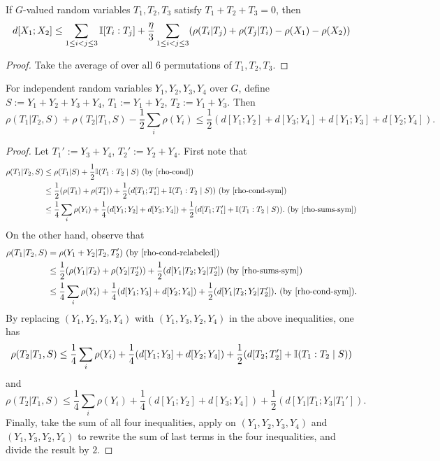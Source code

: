 \begin{lemma}\label{rho-BSG-triplet-symmetrized}
  If $G$-valued random variables $T_1,T_2,T_3$ satisfy $T_1+T_2+T_3=0$, then
  $$d[X_1;X_2] \leq  \sum_{1 \leq i<j \leq 3} \mathbb{I}[T_i:T_j] + \frac{\eta}{3}   \sum_{1 \leq i<j \leq 3} (\rho(T_i|T_j) + \rho(T_j|T_i) -\rho(X_1)-\rho(X_2))$$
\end{lemma}
\begin{proof}
  Take the average of  over all $6$ permutations of $T_1,T_2,T_3$.
\end{proof}


\begin{lemma}\label{rho-increase}
  For independent random variables $Y_1,Y_2,Y_3,Y_4$ over $G$, define $S:=Y_1+Y_2+Y_3+Y_4$, $T_1:=Y_1+Y_2$, $T_2:=Y_1+Y_3$. Then
  $$\rho(T_1|T_2,S)+\rho(T_2|T_1,S) - \frac{1}{2}\sum_{i} \rho(Y_i)\le \frac{1}{2}(d[Y_1;Y_2]+d[Y_3;Y_4]+d[Y_1;Y_3]+d[Y_2;Y_4]).$$
\end{lemma}
\begin{proof}
  Let $T_1':=Y_3+Y_4$, $T_2':=Y_2+Y_4$.
  First note that
  \begin{align*}
    \rho(T_1|T_2,S)
    &\le \rho(T_1|S) + \frac{1}{2}\bbI(T_1:T_2\mid S)  \textrm{ (by \Cref{rho-cond})}\\
    &\le \frac{1}{2}(\rho(T_1)+\rho(T_1'))+\frac{1}{2}(d[T_1;T_1']+\bbI(T_1:T_2\mid S)) \textrm{ (by \Cref{rho-cond-sym})}\\
    &\le \frac{1}{4} \sum_{i} \rho(Y_i) +\frac{1}{4}(d[Y_1;Y_2]+d[Y_3;Y_4]) + \frac{1}{2}(d[T_1;T_1']+\bbI(T_1:T_2\mid S)). \textrm{ (by \Cref{rho-sums-sym})}
  \end{align*}
  On the other hand, observe that
  \begin{align*}
    \rho(T_1|T_2,S)
    &=\rho(Y_1+Y_2|T_2,T_2') \textrm{ (by \Cref{rho-cond-relabeled})}\\
    &\le \frac{1}{2}(\rho(Y_1|T_2)+\rho(Y_2|T_2'))+\frac{1}{2}(d[Y_1|T_2;Y_2|T_2'])  \textrm{ (by \Cref{rho-sums-sym})}\\
    &\le \frac{1}{4} \sum_{i} \rho(Y_i) +\frac{1}{4}(d[Y_1;Y_3]+d[Y_2;Y_4]) + \frac{1}{2}(d[Y_1|T_2;Y_2|T_2']). \textrm{ (by \Cref{rho-cond-sym})}.
  \end{align*}
  By replacing $(Y_1,Y_2,Y_3,Y_4)$ with $(Y_1,Y_3,Y_2,Y_4)$ in the above inequalities, one has
  $$\rho(T_2|T_1,S) \le \frac{1}{4} \sum_{i} \rho(Y_i) +\frac{1}{4}(d[Y_1;Y_3]+d[Y_2;Y_4]) + \frac{1}{2}(d[T_2;T_2']+\mathbb{I}(T_1:T_2\mid S))$$
  and
  $$\rho(T_2|T_1,S) \le \frac{1}{4} \sum_{i} \rho(Y_i) +\frac{1}{4}(d[Y_1;Y_2]+d[Y_3;Y_4]) + \frac{1}{2}(d[Y_1|T_1;Y_3|T_1']).$$
  Finally, take the sum of all four inequalities, apply  on $(Y_1,Y_2,Y_3,Y_4)$ and $(Y_1,Y_3,Y_2,Y_4)$ to rewrite the sum of last terms in the four inequalities, and divide the result by $2$.
\end{proof}

